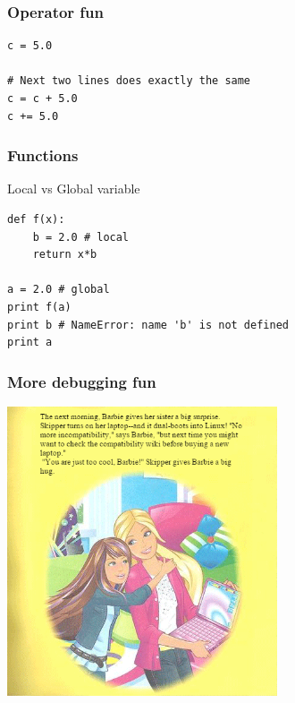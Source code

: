 \begin{frame}[fragile]

    \frametitle{Operator fun}

\begin{lstlisting}
c = 5.0

# Next two lines does exactly the same
c = c + 5.0
c += 5.0
\end{lstlisting}

\end{frame}


\begin{frame}[fragile]

    \frametitle{Functions}

    Local vs Global variable

    \bigskip

\begin{lstlisting}
def f(x):
    b = 2.0 # local
    return x*b

a = 2.0 # global
print f(a)
print b # NameError: name 'b' is not defined
print a
\end{lstlisting}

\end{frame}


\begin{frame}[fragile]
    \frametitle{More debugging fun}
    \begin{center}
        \includegraphics[width=0.6\textwidth]{images/barbie6.png}
    \end{center}
\end{frame}


